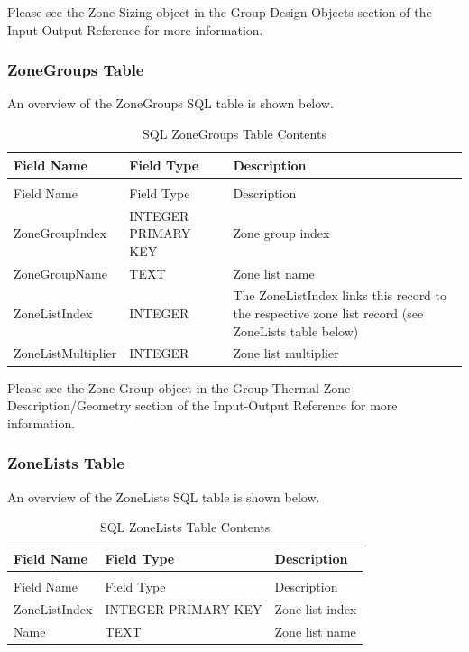 Please see the Zone Sizing object in the Group-Design Objects section of the Input-Output Reference for more information.

\subsubsection{ZoneGroups Table}

An overview of the ZoneGroups SQL table is shown below.

\begin{longtable}[c]{>{\raggedright}p{1.5in}>{\raggedright}p{1.5in}>{\raggedright}p{3.0in}}
\caption{SQL ZoneGroups Table Contents \label{table:table-33.-sql-zonegroups-table-contents}} \tabularnewline
\toprule
Field Name & Field Type & Description \tabularnewline
\midrule
\endfirsthead

\caption[]{SQL ZoneGroups Table Contents} \tabularnewline
\toprule
Field Name & Field Type & Description \tabularnewline
\midrule
\endhead

ZoneGroup\-Index & INTEGER PRIMARY KEY & Zone group index \tabularnewline
ZoneGroupName & TEXT & Zone list name \tabularnewline
ZoneListIndex & INTEGER & The ZoneListIndex links this record to the respective zone list record (see ZoneLists table below) \tabularnewline
ZoneList\-Multiplier & INTEGER & Zone list multiplier \tabularnewline
\bottomrule
\end{longtable}

Please see the Zone Group object in the Group-Thermal Zone Description/Geometry section of the Input-Output Reference for more information.

\subsubsection{ZoneLists Table}

An overview of the ZoneLists SQL table is shown below.

\begin{longtable}[c]{@{}lll@{}}
\caption{SQL ZoneLists Table Contents \label{table:table-34.-sql-zonelists-table-contents}} \tabularnewline
\toprule
Field Name & Field Type & Description \tabularnewline
\midrule
\endfirsthead

\caption[]{SQL ZoneLists Table Contents} \tabularnewline
\toprule
Field Name & Field Type & Description \tabularnewline
\midrule
\endhead

ZoneListIndex & INTEGER PRIMARY KEY & Zone list index \tabularnewline
Name & TEXT & Zone list name \tabularnewline
\bottomrule
\end{longtable}

